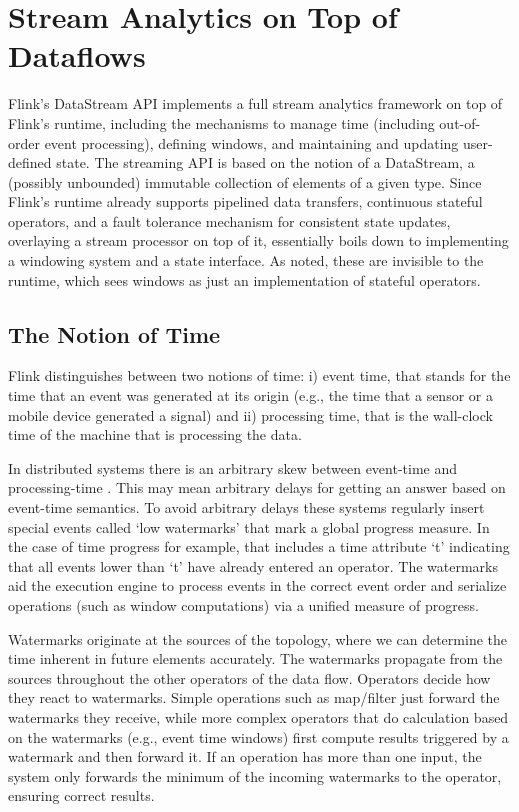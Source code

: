 
\section{Stream Analytics on Top of Dataflows}
\label{sec:windows}


Flink’s DataStream API implements a full stream analytics framework on top of Flink’s runtime, including the mechanisms to manage time (including out-of-order event processing), defining windows, and maintaining and updating user-defined state. The streaming API is based on the notion of a DataStream, a (possibly unbounded) immutable collection of elements of a given type. Since Flink’s runtime already supports pipelined data transfers, continuous stateful operators, and a fault tolerance mechanism for consistent state updates, overlaying a stream processor on top of it, essentially boils down to implementing a windowing system and a state interface. As noted, these are invisible to the runtime, which sees windows as just an implementation of stateful operators. 


\subsection{The Notion of Time}
Flink distinguishes between two notions of time: i) event time, that  stands for the time that an event was generated at its origin (e.g., the time that a sensor or a mobile device generated a signal) and ii) processing time, that is the wall-clock time of the machine that is processing the data.


In distributed systems there is an arbitrary skew between event-time and processing-time \cite{akidau2015dataflow}. This may mean arbitrary delays for getting an answer based on event-time semantics. To avoid arbitrary delays these systems regularly insert special events called ‘low watermarks’ that mark a global progress measure. In the case of time progress for example, that includes a time attribute ‘t’ indicating that all events lower than ‘t’ have already entered an operator. The watermarks aid the execution engine to process events in the correct event order and serialize operations (such as window computations) via a unified measure of progress.

Watermarks originate at the sources of the topology, where we can determine the time inherent in future elements accurately. The watermarks propagate from the sources throughout the other operators of the data flow. Operators decide how they react to watermarks. Simple operations such as map/filter just forward the watermarks they receive, while more complex operators that do calculation based on the watermarks (e.g., event time windows) first compute results triggered by a watermark and then forward it. If an operation has more than one input, the system only forwards the minimum of the incoming watermarks to the operator, ensuring correct results. 

